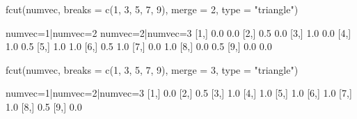 \begin{Schunk}
% --begin: "fcut.merge"
\begin{Sinput}
 fcut(numvec, breaks = c(1, 3, 5, 7, 9), merge = 2, type = "triangle")
\end{Sinput}
\begin{Soutput}
      numvec=1|numvec=2 numvec=2|numvec=3
 [1,]               0.0               0.0
 [2,]               0.5               0.0
 [3,]               1.0               0.0
 [4,]               1.0               0.5
 [5,]               1.0               1.0
 [6,]               0.5               1.0
 [7,]               0.0               1.0
 [8,]               0.0               0.5
 [9,]               0.0               0.0
\end{Soutput}
\begin{Sinput}
 fcut(numvec, breaks = c(1, 3, 5, 7, 9), merge = 3, type = "triangle")
\end{Sinput}
\begin{Soutput}
      numvec=1|numvec=2|numvec=3
 [1,]                        0.0
 [2,]                        0.5
 [3,]                        1.0
 [4,]                        1.0
 [5,]                        1.0
 [6,]                        1.0
 [7,]                        1.0
 [8,]                        0.5
 [9,]                        0.0
\end{Soutput}
%
% --end: "fcut.merge"
\end{Schunk}
